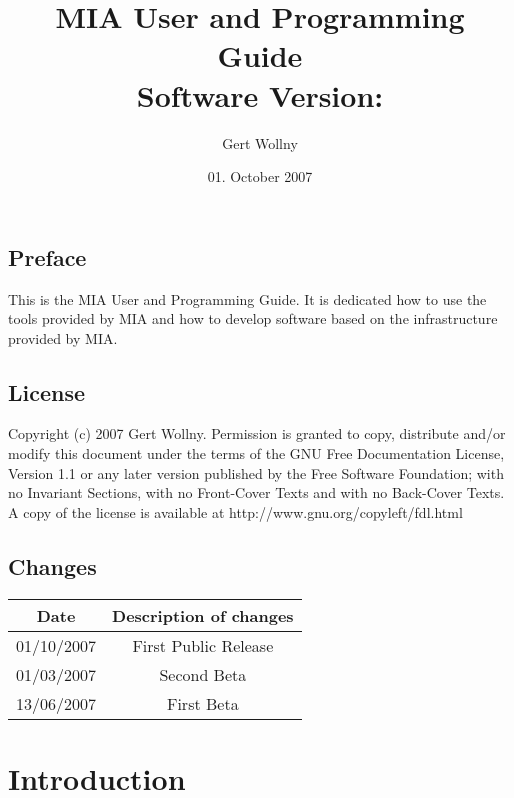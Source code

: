 \documentclass[english, 10pt, a4paper,headsepline,openany]{scrbook}
\begin{document}
\vfill{}
\title{MIA User and Programming Guide \\Software Version: \miaversion}
\vfill{}


\date{01. October 2007}


\author{Gert Wollny}

\maketitle

\section*{Preface}

This is the MIA User and Programming Guide. 
It is dedicated how to use the tools provided by MIA and how to develop software based on the infrastructure provided by MIA.


\section*{License}

Copyright (c) 2007 Gert Wollny.
Permission is granted to copy, distribute and/or modify this document under the terms of the GNU Free Documentation License, Version 1.1
  or any later version published by the Free Software Foundation; with no Invariant Sections, 
  with no Front-Cover Texts and with no Back-Cover Texts. 
A copy of the license is available at http://www.gnu.org/copyleft/fdl.html

\section*{Changes}

\begin{center}
\begin{tabular}{|c|c|}
\hline 
Date  & Description of changes\\
\hline
\hline 
01/10/2007 & First Public Release  \\
01/03/2007 & Second Beta \\
13/06/2007 & First Beta  \\
\hline
\end{tabular}
\end{center}

\tableofcontents{}

\pagestyle{headings}


\chapter{Introduction}
\end{document}
